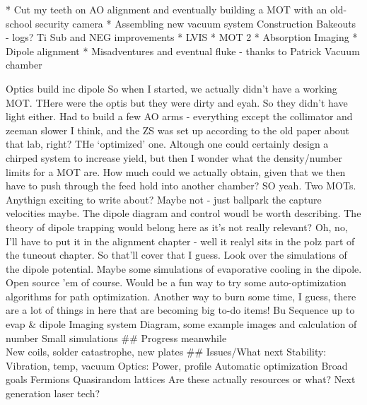 * Cut my teeth on AO alignment and eventually building
a MOT with an old-school security camera * Assembling new vacuum system
Construction Bakeouts - logs? Ti Sub and NEG improvements * LVIS * MOT 2
* Absorption Imaging * Dipole alignment * Misadventures and eventual
fluke - thanks to Patrick
Vacuum chamber

Optics build inc dipole So when I started, we actually didn't have a
working MOT.
	THere were the optis but they were dirty and eyah.
	So they
didn't have light either.
	Had to build a few AO arms - everything except
the collimator and zeeman slower I think, and the ZS was set up
according to the old paper about that lab, right? THe `optimized' one.
Altough one could certainly design a chirped system to increase yield,
but then I wonder what the density/number limits for a MOT are.
	How much
could we actually obtain, given that we then have to push through the
feed hold into another chamber? SO yeah.
	Two MOTs.
	Anythign exciting to
write about? Maybe not - just ballpark the capture velocities maybe.
	The
dipole diagram and control woudl be worth describing.
	The theory of
dipole trapping would belong here as it's not really relevant? Oh, no,
I'll have to put it in the alignment chapter - well it realyl sits in
the polz part of the tuneout chapter.
	So that'll cover that I guess.
Look over the simulations of the dipole potential.
	Maybe some
simulations of evaporative cooling in the dipole.
	Open source 'em of
course.
	Would be a fun way to try some auto-optimization algorithms for
path optimization.
	Another way to burn some time, I guess, there are a
lot of things in here that are becoming big to-do items! Bu Sequence up
to evap \& dipole Imaging system Diagram, some example images and
calculation of number Small simulations \#\# Progress meanwhile\\
New coils, solder catastrophe, new plates \#\# Issues/What next
Stability: Vibration, temp, vacuum Optics: Power, profile Automatic
optimization Broad goals Fermions Quasirandom lattices Are these
actually resources or what? Next generation laser tech?

